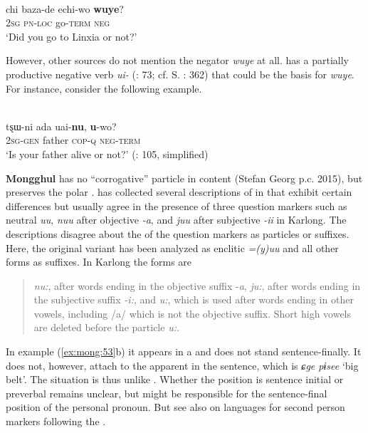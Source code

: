\ea%
    \label{ex:mong:51}
    \\
    \gll chi  baza-de  echi-wo \textbf{{wuye}}?\\
    2\textsc{sg}  \textsc{pn}-\textsc{loc}    go-\textsc{term}  \textsc{neg}\\
    \glt ‘Did you go to Linxia or not?’ \citep[41]{Napoli2014}
    \z

\noindent However, other sources do not mention the negator \textit{wuye} at all.  has a partially productive negative verb \textit{ui-} (\citealt{LiuZhaoxiong1981}: 73; cf. S. \citealt{Kim2003}: 362) that could be the basis for \textit{wuye}. For instance, consider the following example.

\ea%
    \label{ex:mong:52}
    \\
    \gll tȿɯ-ni    ada  uai-\textbf{{nu}}, \textbf{{u}}{-wo?}\\
    2\textsc{sg}-\textsc{gen}  father  \textsc{cop}-\textsc{q}    \textsc{neg}-\textsc{term}\\
    \glt ‘Is your father alive or not?’ (\citealt{LiuZhaoxiong1981}: 105, simplified)
    \z

\textbf{Mongghul} has no “corrogative” particle in content  (Stefan Georg p.c. 2015), but preserves the polar . \citet{Faehndrich2007} has collected several descriptions of  in  that exhibit certain differences but usually agree in the presence of three question markers such as neutral \textit{uu}, \textit{nuu} after objective \textit{-a}, and \textit{juu} after subjective \textit{-ii} in Karlong. The descriptions disagree about the  of the question markers as particles or suffixes. Here, the original variant has been analyzed as enclitic \textit{=(y)uu} and all other forms as suffixes. In Karlong  the forms are

\begin{quote}
\textit{nu:}, after words ending in the objective suffix -\textit{a}, \textit{ju:}, after words ending in the subjective suffix \textit{-i:}, and \textit{u:}, which is used after words ending in other vowels, including /a/ which is not the objective suffix. Short high vowels are deleted before the  particle \textit{u:}. \citep[221]{Faehndrich2007}
\end{quote}

\noindent In example (\ref{ex:mong:53}b) it appears in a  and does not stand sentence-finally. It does not, however, attach to the apparent  in the sentence, which is \textit{ɕge pɨsee} ‘big belt’. The situation is thus unlike . Whether the  position is sentence initial or preverbal remains unclear, but might be responsible for the sentence-final position of the personal pronoun. But see also  on  languages for second person markers following the .


